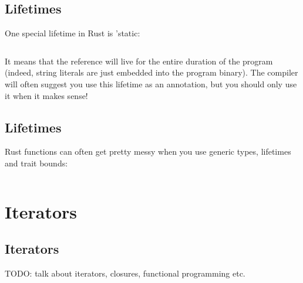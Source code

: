 \documentclass[usenames,twocolumn,dvipsnames,10pt,a4wide]{article}
\begin{document}
\subsection{Lifetimes}
	One special lifetime in Rust is 'static:
	\inputminted[fontsize=\normalsize]{rust}{code/lifetimes8.rs}
	It means that the reference will live for the entire
	duration of the program (indeed, string literals
	are just embedded into the program binary).
	The compiler will often suggest you use this
	lifetime as an annotation, but you should only
	use it when it makes sense!


\subsection{Lifetimes}
	Rust functions can often get pretty messy when you use
	generic types, lifetimes and trait bounds:
	\inputminted[fontsize=\normalsize]{rust}{code/lifetimes9.rs}


\section{Iterators}

\subsection{Iterators}
TODO: talk about iterators, closures, functional programming etc.
	

 

%

 
\end{document}
